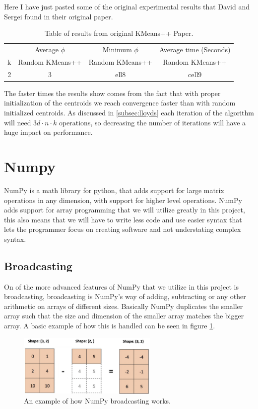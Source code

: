 \documentclass[12pt]{report}
\begin{document}
Here I have just pasted some of the original experimental results that David and Sergei found in their original paper.

\begin{table}[h!]
  \centering
    \begin{tabular}{|c| c |c| c| }
      & Average $\phi$ & Minimum $\phi$ & Average time (Seconds) \\
      k & Random KMeans++ & Random KMeans++ & Random KMeans++ \\
      \hline
      2&3&  ell8 & cell9
    \end{tabular}
    \caption{Table of results from original KMeans++ Paper.}
    \label{table:kpp}
\end{table}

The faster times the results show comes from the fact that with proper initialization of the centroids we reach convergence faster than with random initialized centroids. As discussed in \ref{subsec:lloyds} each iteration of the algorithm will need $3d \cdot n\cdot k$ operations, so decreasing the number of iterations will have a huge impact on performance.

\section{Numpy}
\label{sec:numpy}
NumPy is a math library for python, that adds support for large matrix operations in any dimension, with support for higher level operations. NumPy adds support for array programming that we will utilize greatly in this project, this also means that we will have to write less code and use easier syntax that lets the programmer focus on creating software and not understating complex syntax.
\subsection{Broadcasting}
\label{subsec:Broadcasting}

On of the more advanced features of NumPy that we utilize in this project is broadcasting, broadcasting is NumPy's way of adding, subtracting or any other arithmetic on arrays of different sizes. Basically NumPy duplicates the smaller array such that the size and dimension of the smaller array matches the bigger array. A basic example of how this is handled can be seen in figure \ref{fig:broadcasting}.

\begin{figure}[H]
  \centering
  \includegraphics[width = 0.6\textwidth]{images/broadcasting.png}
  \caption{An example of how NumPy broadcasting works.\label{fig:broadcasting}}
\end{figure}
\end{document}
